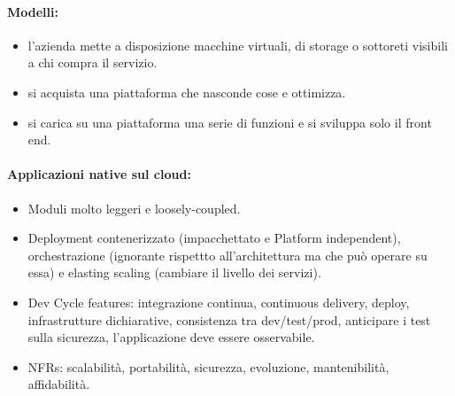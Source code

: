 
\paragraph{Modelli:}

\begin{itemize}
	\item {} l'azienda mette a disposizione macchine virtuali, di storage o sottoreti visibili a chi compra il servizio.
	\item {} si acquista una piattaforma che nasconde cose e ottimizza.
	\item {} si carica su una piattaforma una serie di funzioni e si sviluppa solo il front end.
\end{itemize}

\paragraph{Applicazioni native sul cloud:}

\begin{itemize}
	\item Moduli molto leggeri e loosely-coupled.
	\item Deployment contenerizzato (impacchettato e Platform independent), orchestrazione (ignorante rispettto all'architettura ma che può operare su essa) e elasting scaling (cambiare il livello dei servizi).
	\item Dev Cycle features: integrazione continua, continuous delivery, deploy, infrastrutture dichiarative, consistenza tra dev/test/prod, anticipare i test sulla sicurezza, l'applicazione deve essere osservabile.
	\item NFRs: scalabilità, portabilità, sicurezza, evoluzione, mantenibilità, affidabilità.
\end{itemize}


